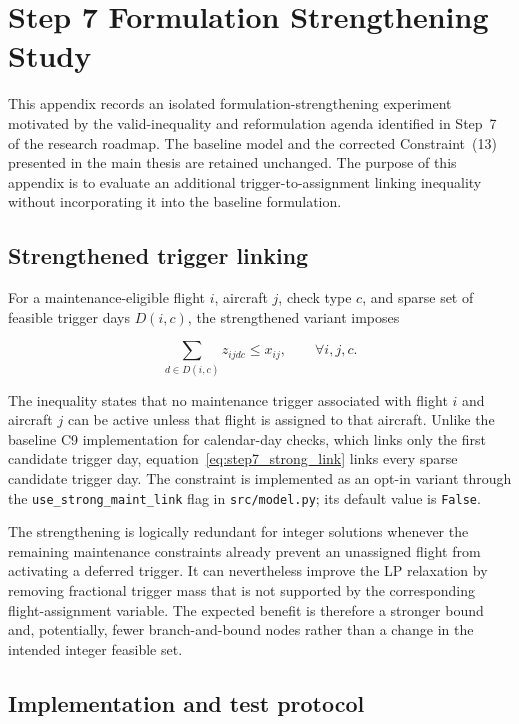 \chapter{Step 7 Formulation Strengthening Study}
\label{ch:step7}

This appendix records an isolated formulation-strengthening experiment motivated by the valid-inequality and reformulation agenda identified in Step~7 of the research roadmap. The baseline model and the corrected Constraint~(13) presented in the main thesis are retained unchanged. The purpose of this appendix is to evaluate an additional trigger-to-assignment linking inequality without incorporating it into the baseline formulation.

\section{Strengthened trigger linking}

For a maintenance-eligible flight $i$, aircraft $j$, check type $c$, and sparse set of feasible trigger days $D(i,c)$, the strengthened variant imposes

\begin{equation}
    \sum_{d\in D(i,c)} z_{ijdc} \leq x_{ij},
    \qquad \forall i,j,c.
    \label{eq:step7_strong_link}
\end{equation}

The inequality states that no maintenance trigger associated with flight $i$ and aircraft $j$ can be active unless that flight is assigned to that aircraft. Unlike the baseline C9 implementation for calendar-day checks, which links only the first candidate trigger day, equation~\eqref{eq:step7_strong_link} links every sparse candidate trigger day. The constraint is implemented as an opt-in variant through the
\texttt{use\_strong\_maint\_link} flag in \texttt{src/model.py}; its default value is \texttt{False}.

The strengthening is logically redundant for integer solutions whenever the remaining maintenance constraints already prevent an unassigned flight from activating a deferred trigger. It can nevertheless improve the LP relaxation by removing fractional trigger mass that is not supported by the corresponding flight-assignment variable. The expected benefit is therefore a stronger bound and, potentially, fewer branch-and-bound nodes rather than a change in the intended integer feasible set.

\section{Implementation and test protocol}

